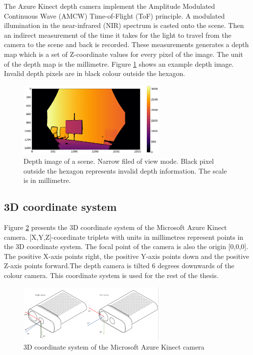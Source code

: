 The Azure Kinect depth camera implement the Amplitude Modulated Continuous Wave (AMCW) Time-of-Flight (ToF) principle. A modulated illumination in the near-infrared (NIR) spectrum is casted onto the scene. Then an indirect measurement of the time it takes for the light to travel from the camera to the scene and back is recorded. These measurements generates a depth map which is a set of Z-coordinate values for every pixel of the image. The unit of the depth map is the millimetre. Figure \ref{figure:depth_sample} shows an example depth image. Invalid depth pixels are in black colour outside the hexagon.

\begin{figure}[H]
    \centering
    \includegraphics[width=0.65\textwidth]{images/depth_sample.png}
    \caption{Depth image of a scene. Narrow filed of view mode. Black pixel outside the hexagon represents invalid depth information. The scale is in millimetre.}
    \label{figure:depth_sample}
\end{figure}

\subsection{3D coordinate system}
\label{section:3D coordinate system}


Figure \ref{figure:coordinate-systems-camera-features} presents the 3D coordinate system of the Microsoft Azure Kinect camera. [X,Y,Z]-coordinate triplets with units in millimetres represent points in the 3D coordinate system. The focal point of the camera is also the origin [0,0,0]. The positive X-axis points right, the positive Y-axis points down and the positive Z-axis points forward.The depth camera is tilted 6 degrees downwards of the colour camera. This coordinate system is used for the rest of the thesis.

\begin{figure}[H]
    \centering
    \includegraphics[width=0.65\textwidth]{images/apparatus/coordinate-systems-camera-features.png}
    \caption{3D coordinate system of the Microsoft Azure Kinect camera}
    \label{figure:coordinate-systems-camera-features}
\end{figure}

